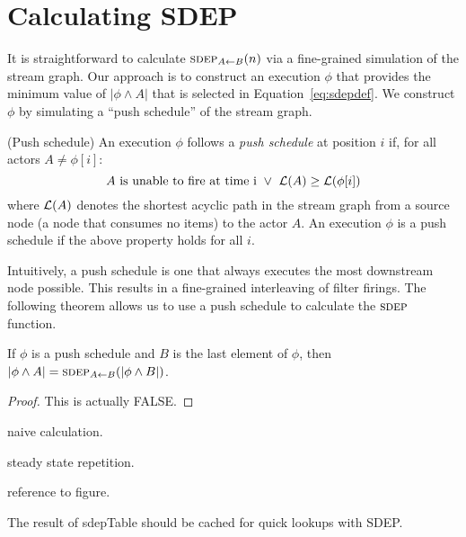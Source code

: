 \section{Calculating SDEP}

It is straightforward to calculate $\sdepf{A}{B}(n)$ via a
fine-grained simulation of the stream graph.  Our approach is to
construct an execution $\phi$ that provides the minimum value of
$|\phi \wedge A|$ that is selected in Equation~\ref{eq:sdepdef}.  We
construct $\phi$ by simulating a ``push schedule'' of the stream
graph.
\begin{definition}(Push schedule)
An execution $\phi$ follows a {\it push schedule} at position $i$ if,
for all actors $A \ne \phi[i]$:
\[
A~\mbox{is unable to fire at time i} ~\vee~ {\cal L}(A) \ge {\cal L}(\phi[i])
\]
where ${\cal L}(A)$ denotes the shortest acyclic path in the stream
graph from a source node (a node that consumes no items) to the actor
$A$.  An execution $\phi$ is a push schedule if the above property
holds for all $i$.
\end{definition}
Intuitively, a push schedule is one that always executes the most
downstream node possible.  This results in a fine-grained interleaving
of filter firings.  The following theorem allows us to use a push
schedule to calculate the $\textsc{sdep}$ function.
\begin{theorem}  If $\phi$ is a push schedule and $B$ is the last element 
of $\phi$, then $|\phi \wedge A| = \sdepf{A}{B}(|\phi \wedge B|)$.
\end{theorem}
\begin{proof}
This is actually FALSE.
\end{proof}

naive calculation.

steady state repetition.

reference to figure.

The result of sdepTable should be cached for quick lookups with SDEP.


